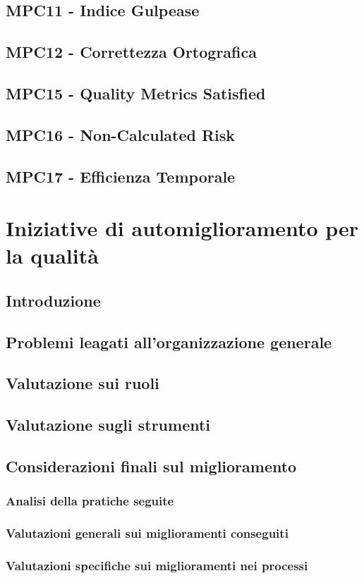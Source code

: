 \documentclass[italian,12pt]{article} %
\begin{document}
\subsection{MPC11 - Indice Gulpease}

\subsection{MPC12 - Correttezza Ortografica}

\subsection{MPC15 - Quality Metrics Satisfied}

\subsection{MPC16 - Non-Calculated Risk}

\subsection{MPC17 - Efficienza Temporale}

\section{Iniziative di automiglioramento per la qualità}

\subsection{Introduzione}

\subsection{Problemi leagati all’organizzazione generale}

\subsection{Valutazione sui ruoli}

\subsection*{Valutazione sugli strumenti}

\subsection{Considerazioni finali sul miglioramento}

\subsubsection{Analisi della pratiche seguite}

\subsubsection{Valutazioni generali sui miglioramenti conseguiti}

\subsubsection{Valutazioni specifiche sui miglioramenti nei processi}


\end{document}
